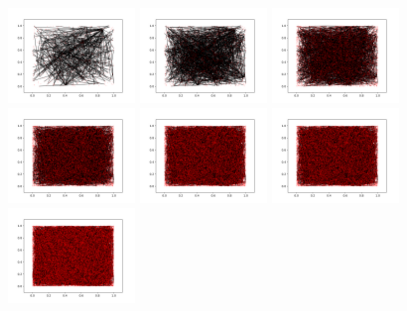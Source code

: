 \documentclass{article}
\begin{document}
\begin{figure}[h!]
    \centering
    \includegraphics[width=0.3\textwidth]{NormalImgurGraphNoOp5.png}
    \includegraphics[width=0.3\textwidth]{NormalImgurGraphNoOp10.png}
    \includegraphics[width=0.3\textwidth]{NormalImgurGraphNoOp15.png}
    \includegraphics[width=0.3\textwidth]{NormalImgurGraphNoOp20.png}
    \includegraphics[width=0.3\textwidth]{NormalImgurGraphNoOp25.png}
    \includegraphics[width=0.3\textwidth]{NormalImgurGraphNoOp30.png}
    \includegraphics[width=0.3\textwidth]{NormalImgurGraphNoOp35.png}

\end{figure}
\end{document}
